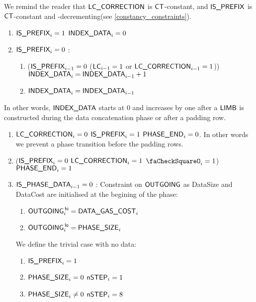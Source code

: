 \begin{center}
\end{center}

We remind the reader that $\textsf{LC\_CORRECTION}$ is $\textsf{CT}$-constant, and $\textsf{IS\_PREFIX}$ is $\textsf{CT}$-constant and \phaseData{}-decrementing(see \ref{constancy_constraints}).
\begin{enumerate}
    \item \If $\textsf{IS\_PREFIX}_{i}=1$ \Then $\textsf{INDEX\_DATA}_{i}=0$
    \item \If $\textsf{IS\_PREFIX}_{i}=0$ \Then: 
    \begin{enumerate}
        \item \If ($\textsf{IS\_PREFIX}_{i-1}=0$ \et ($\textsf{LC}_{i-1}=1$ or $\textsf{LC\_CORRECTION}_{i-1}=1$)) \Then $\textsf{INDEX\_DATA}_{i}=\textsf{INDEX\_DATA}_{i-1} + 1$
        \item \Else $\textsf{INDEX\_DATA}_{i}=\textsf{INDEX\_DATA}_{i-1}$
    \end{enumerate}
\end{enumerate}
In other words, $\textsf{INDEX\_DATA}$ starts at 0 and increases by one after a $\textsf{LIMB}$ is constructed during the data concatenation phase or after a padding row. %
\begin{enumerate}[resume]
    \item \If $\textsf{LC\_CORRECTION}_{i} = 0$ \Or $\textsf{IS\_PREFIX}_{i}=1$ \Then $\textsf{PHASE\_END}_{i}=0$. In other words we prevent a phase transition before the padding rows.
    \item \If ($\textsf{IS\_PREFIX}_{i}=0$ \et $\textsf{LC\_CORRECTION}_{i} = 1$ \et $\done_{i}=1$) \Then $\textsf{PHASE\_END}_{i}=1$
    \item \If $\textsf{IS\_PHASE\_DATA}_{i-1}=0$ \Then:
    Constraint on $\textsf{OUTGOING}$ as DataSize and DataCost are initialised at the begining of the phase:
    \begin{enumerate}
        \item $\textsf{OUTGOING}^{\mathsf{\,hi}}_{i}=\textsf{DATA\_GAS\_COST}_{i}$
        \item $\textsf{OUTGOING}^{\mathsf{\,lo}}_{i}=\textsf{PHASE\_SIZE}_{i}$
    \end{enumerate} 
    We define the trivial case with no data:
    \begin{enumerate}[resume]
        \item $\textsf{IS\_PREFIX}_{i}=1$
        \item \If $\textsf{PHASE\_SIZE}_{i}=0$ \Then $\textsf{nSTEP}_{i}=1$
        \item \If $\textsf{PHASE\_SIZE}_{i} \ne 0$ \Then $\textsf{nSTEP}_{i}=8$ 
    \end{enumerate}
\end{enumerate}
